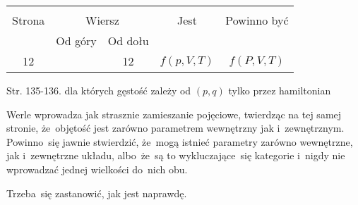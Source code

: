\documentclass[a4paper,11pt]{article}
\begin{document}
\begin{center}

  \begin{tabular}{|c|c|c|c|c|}
    \hline
    & \multicolumn{2}{c|}{} & & \\
    Strona & \multicolumn{2}{c|}{Wiersz} & Jest
                              & Powinno być \\ \cline{2-3}
    & Od góry & Od dołu & & \\
    \hline
    12  & & 12 & $f( p, V, T )$ & $f( P, V, T )$ \\
    \hline
  \end{tabular}

\end{center}



Str. 135-136. dla których gęstość zależy od $( p, q )$ tylko przez hamiltonian \\

\vspace{\spaceTwo}





\noi {}

\vspace{\spaceThree}

\start {} Werle wprowadza jak strasznie zamieszanie pojęciowe,
twierdząc na tej samej stronie, że~objętość jest zarówno parametrem
wewnętrzny jak i~zewnętrznym. Powinno~się jawnie stwierdzić, że~mogą
istnieć parametry zarówno wewnętrzne, jak i~zewnętrzne układu,
albo~że~są to wykluczające~się kategorie i~nigdy nie wprowadzać
jednej wielkości do~nich obu.

Trzeba~się zastanowić, jak jest naprawdę. \Dok

\start {}
\end{document}
